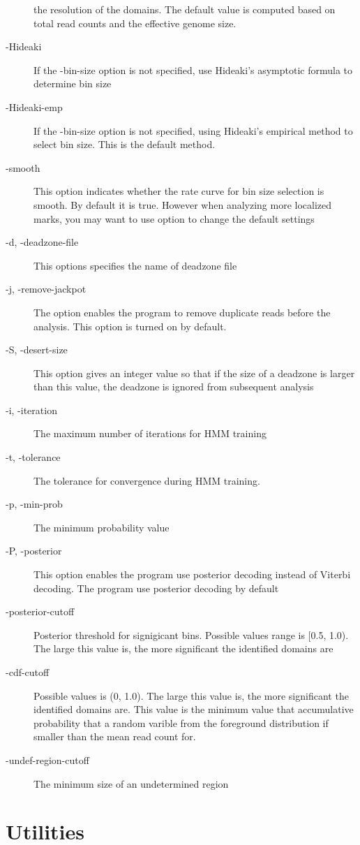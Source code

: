 \documentclass[11pt]{report}
\begin{document}
\begin{description}
  the resolution of the domains. The default value is computed based
  on total read counts and the effective genome size.
\item[-Hideaki] If the -bin-size option is not specified, use
  Hideaki's asymptotic formula to determine bin size
\item[-Hideaki-emp] If the -bin-size option is not specified, using
  Hideaki's empirical method to select bin size. This is the default
  method.
\item[-smooth] This option indicates whether the rate curve for bin
  size selection is smooth. By default it is true. However when
  analyzing more localized marks, you may want to use option to change
  the default settings
\item[-d, -deadzone-file] This options specifies the name of deadzone
  file
\item[-j, -remove-jackpot] The option enables the program to remove
  duplicate reads before the analysis. This option is turned on by
  default.
\item[-S, -desert-size] This option gives an integer value so that if
  the size of a deadzone is larger than this value, the deadzone is
  ignored from subsequent analysis
\item[-i, -iteration] The maximum number of iterations for HMM
  training
\item[-t, -tolerance] The tolerance for convergence during HMM
  training.
\item[-p, -min-prob] The minimum probability value
\item[-P, -posterior] This option enables the program use posterior
  decoding instead of Viterbi decoding. The program use posterior
  decoding by default
\item[-posterior-cutoff] Posterior threshold for signigicant
  bins. Possible values range is [0.5, 1.0). The large this value is,
  the more significant the identified domains are
\item[-cdf-cutoff] Possible values is (0, 1.0). The large this value
  is, the more significant the identified domains are. This value is
  the minimum value that accumulative probability that a random
  varible from the foreground distribution if smaller than the mean
  read count for.
\item[-undef-region-cutoff] The minimum size of an undetermined region
\end{description}


\section{Utilities}
\label{sec:utilities}
\end{document}
